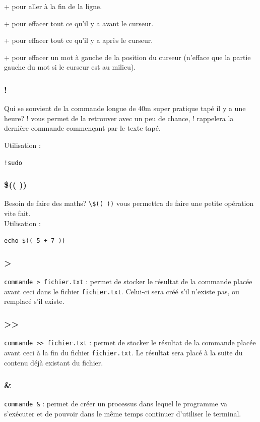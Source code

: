 \documentclass[a4paper,twoside]{article}
\begin{document}
 +  pour aller à  la fin de la ligne.

 +  pour effacer tout ce qu'il y a avant le curseur.

 +  pour effacer tout ce qu'il y a après le curseur.

 +  pour effacer un mot à gauche de la position du curseur (n'efface que la partie gauche du mot si le curseur est au milieu).

\subsubsection{!}
Qui se souvient de la commande longue de 40m super pratique tapé il y a une heure? ! vous permet de la retrouver avec un peu de chance, ! rappelera la dernière commande commençant par le texte tapé.

Utilisation :

\verb|!sudo|

\subsubsection{\$(( ))}
Besoin de faire des maths? \verb|\$(( ))| vous permettra de faire une petite opération vite fait.\\
Utilisation :

\verb|echo $(( 5 + 7 ))|

\subsubsection{>}
\verb|commande > fichier.txt| : permet de stocker le résultat de la commande placée avant ceci dans le fichier \texttt{fichier.txt}. Celui-ci sera créé s'il n'existe pas, ou remplacé s'il existe.

\subsubsection{>>}
\verb|commande >> fichier.txt| : permet de stocker le résultat de la commande placée avant ceci à la fin du fichier \texttt{fichier.txt}. Le résultat sera placé à la suite du contenu déjà existant du fichier.

\subsubsection{\&}
\verb|commande &| : permet de créer un processus dans lequel le programme va s'exécuter et de pouvoir dans le même temps continuer d'utiliser le terminal.
\end{document}
